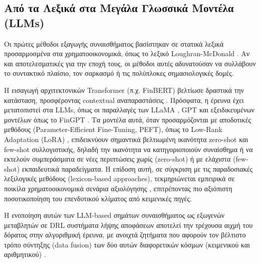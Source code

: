 \subsection{Από τα Λεξικά στα Μεγάλα Γλωσσικά Μοντέλα (LLMs)}
Οι πρώτες μέθοδοι εξαγωγής συναισθήματος βασίστηκαν σε στατικά λεξικά προσαρμοσμένα στα 
χρηματοοικονομικά, όπως το λεξικό Loughran-McDonald \cite{loughran2011}. Αν και αποτελεσματικές 
για την εποχή τους, οι μέθοδοι αυτές αδυνατούσαν να συλλάβουν το συντακτικό πλαίσιο, τον σαρκασμό 
ή τις πολύπλοκες σημασιολογικές δομές.

Η εισαγωγή αρχιτεκτονικών Transformer (π.χ. FinBERT) βελτίωσε δραστικά την κατάσταση, προσφέροντας 
contextual αναπαραστάσεις \cite{araci2019finbert}. Πρόσφατα, η έρευνα έχει μετατοπιστεί στα LLMs, 
όπως οι παραλλαγές των LLaMA \cite{touvron2023llama}, GPT και εξειδικευμένων μοντέλων όπως το FinGPT \cite{yang2023fingpt}.
Τα μοντέλα αυτά, όταν προσαρμόζονται με αποδοτικές μεθόδους (Parameter-Efficient Fine-Tuning, PEFT), 
όπως το Low-Rank Adaptation (LoRA) \cite{hu2021lora}, επιδεικνύουν σημαντικά βελτιωμένη ικανότητα zero-shot και 
few-shot συλλογιστικής, δηλαδή την ικανότητα να κατηγοριοποιούν συναίσθημα ή να εκτελούν 
συμπεράσματα σε νέες περιπτώσεις χωρίς (zero-shot) ή με ελάχιστα (few-shot) εκπαιδευτικά παραδείγματα. 
Η επίδοση αυτή, σε σύγκριση με τις παραδοσιακές λεξιλογικές μεθόδους (lexicon-based approaches), 
τεκμηριώνεται εμπειρικά σε ποικίλα χρηματοοικονομικά σενάρια αξιολόγησης \cite{yang2023fingpt}, 
επιτρέποντας πιο αξιόπιστη ποσοτικοποίηση του επενδυτικού κλίματος από κειμενικές πηγές.

Η ενοποίηση αυτών των LLM-based σημάτων συναισθήματος ως εξωγενών μεταβλητών σε DRL συστήματα 
λήψης αποφάσεων αποτελεί την τρέχουσα αιχμή του δόρατος στην αλγοριθμική έρευνα, με ανοιχτά 
ζητήματα που αφορούν τον βέλτιστο τρόπο σύντηξης (data fusion) των δύο αυτών διαφορετικών 
κόσμων (κειμενικού και αριθμητικού) \cite{benhenda2025finrldeepseek, yang2023fingpt}.